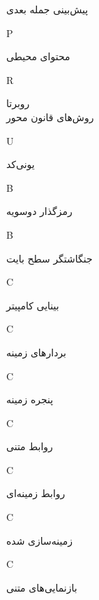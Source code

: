 	 \dotfill 	پیش‌بینی جمله بعدی \\ 
\begin{center}
P
\end{center}
	 \dotfill 	 محتوای محیطی \\ 
\begin{center}
R
\end{center}
	 \dotfill 	روبرتا \\ 
	 \dotfill 	روش‌های قانون محور \\ 
\begin{center}
U
\end{center}
	 \dotfill 	یونی‌کد \\ 
\begin{center}
B
\end{center}
	 \dotfill 	 رمزگذار دوسویه \\ 
\begin{center}
B
\end{center}
	 \dotfill 	جنگاشتگر سطح بایت \\ 
\begin{center}
C
\end{center}
	 \dotfill 	بینایی کامپیتر \\ 
\begin{center}
C
\end{center}
	 \dotfill 	بردار‌های زمینه \\ 
\begin{center}
C
\end{center}
	 \dotfill 	پنجره زمینه \\ 
\begin{center}
C
\end{center}
	 \dotfill 	روابط متنی \\ 
\begin{center}
C
\end{center}
	 \dotfill 	روابط زمینه‌ای \\ 
\begin{center}
C
\end{center}
	 \dotfill 	زمینه‌سازی شده \\ 
\begin{center}
C
\end{center}
	 \dotfill 	بازنمایی‌های متنی \\ 
